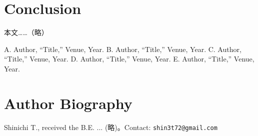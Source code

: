 \documentclass[conference]{IEEEtran}
\begin{document}
\section{Conclusion}
本文……（略）


\begin{thebibliography}{00}
 A. Author, “Title,” Venue, Year.
 B. Author, “Title,” Venue, Year.
 C. Author, “Title,” Venue, Year.
 D. Author, “Title,” Venue, Year.
 E. Author, “Title,” Venue, Year.
\end{thebibliography}

\section*{Author Biography}
\small
Shinichi T., received the B.E. ... (略)。Contact: \texttt{shin3t72@gmail.com}
\end{document}
